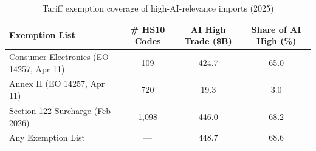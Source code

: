 \begin{table}[htbp]
\centering
\caption{Tariff exemption coverage of high-AI-relevance imports (2025)}
\label{tab:exemption_coverage}
\setlength{\tabcolsep}{1.95mm}
\renewcommand{\arraystretch}{1.60}
{\small
\begin{tabular}{lccc}
\toprule
Exemption List & \# HS10 Codes & AI High Trade (\$B) & Share of AI High (\%) \\
\midrule
Consumer Electronics (EO 14257, Apr 11) & 109 & 424.7 & 65.0 \\
Annex II (EO 14257, Apr 11) & 720 & 19.3 & 3.0 \\
Section 122 Surcharge (Feb 2026) & 1,098 & 446.0 & 68.2 \\
\midrule
Any Exemption List & --- & 448.7 & 68.6 \\
\bottomrule
\end{tabular}}
\end{table}
